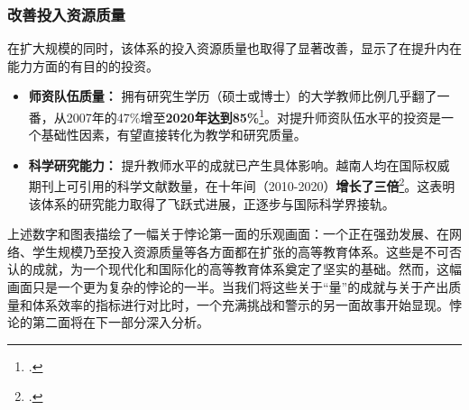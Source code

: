 \subsubsection{改善投入资源质量}
在扩大规模的同时，该体系的投入资源质量也取得了显著改善，显示了在提升内在能力方面的有目的的投资。
\begin{itemize}
    \item \textbf{师资队伍质量：} 拥有研究生学历（硕士或博士）的大学教师比例几乎翻了一番，从2007年的47\%增至\textbf{2020年达到85\%}\footcite{worldbank_p178112}。对提升师资队伍水平的投资是一个基础性因素，有望直接转化为教学和研究质量。
    \item \textbf{科学研究能力：} 提升教师水平的成就已产生具体影响。越南人均在国际权威期刊上可引用的科学文献数量，在十年间（2010-2020）\textbf{增长了三倍}\footcite{worldbank_improvingperformance_2020}。这表明该体系的研究能力取得了飞跃式进展，正逐步与国际科学界接轨。
\end{itemize}

上述数字和图表描绘了一幅关于悖论第一面的乐观画面：一个正在强劲发展、在网络、学生规模乃至投入资源质量等各方面都在扩张的高等教育体系。这些是不可否认的成就，为一个现代化和国际化的高等教育体系奠定了坚实的基础。然而，这幅画面只是一个更为复杂的悖论的一半。当我们将这些关于“量”的成就与关于产出质量和体系效率的指标进行对比时，一个充满挑战和警示的另一面故事开始显现。悖论的第二面将在下一部分深入分析。






